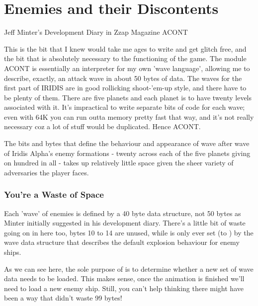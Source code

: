 \chapter{Enemies and their Discontents} 

\lstset{style=6502Style}

\begin{q}{Jeff Minter's Development Diary in Zzap Magazine\cite{planner}}
ACONT 

This is the bit that I knew would take me ages to write and get glitch
free, and the bit that is absolutely necessary to the functioning of the game.
The module ACONT is essentially an interpreter for my own 'wave language',
allowing me to describe, exactly, an attack wave in about 50 bytes of data. The
waves for the first part of IRIDIS are in good rollicking shoot-'em-up style,
and there have to be plenty of them. There are five planets and each planet is
to have twenty levels associated with it. It's impractical to write separate
bits of code for each wave; even with 64K you can run outta memory pretty fast
that way, and it's not really necessary coz a lot of stuff would be duplicated.
Hence ACONT.

\end{q}

The bits and bytes that define the behaviour and appearance of
wave after wave of Iridis Alpha's enemy formations - twenty across each of the
five planets giving on hundred in all - takes up relatively little space given
the sheer variety of adversaries the player faces.

\subsection{You're a Waste of Space}
Each 'wave' of enemies is defined by a 40 byte data structure, not 50 bytes as
Minter initially suggested in his development diary. There's a little bit of 
waste going on in here too, bytes 10 to 14 are unused, while  is only
ever set (to ) by the wave data structure that describes the default explosion 
behaviour for enemy ships.

As we can see here, the sole purpose of  is to determine whether a
new set of wave data needs to be loaded. This makes sense, once the animation is finished
we'll need to load a new enemy ship. Still, you can't help thinking there might have been 
a way that didn't waste 99 bytes! 

%


